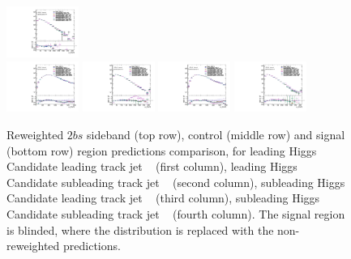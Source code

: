 \begin{figure}[htbp!]
\begin{center}
\includegraphics[width=0.21\textwidth,angle=-90]{figures/boosted/AppendixReweight/Compare/Data_TwoTag_split_Control_directcompare_sublHCand_trk1_Pt_1.pdf}\\
\includegraphics[width=0.21\textwidth,angle=-90]{figures/boosted/AppendixReweight/Compare/Data_TwoTag_split_Signal_directcompare_leadHCand_trk0_Pt_1.pdf}
\includegraphics[width=0.21\textwidth,angle=-90]{figures/boosted/AppendixReweight/Compare/Data_TwoTag_split_Signal_directcompare_leadHCand_trk1_Pt_1.pdf}
\includegraphics[width=0.21\textwidth,angle=-90]{figures/boosted/AppendixReweight/Compare/Data_TwoTag_split_Signal_directcompare_sublHCand_trk0_Pt_1.pdf}
\includegraphics[width=0.21\textwidth,angle=-90]{figures/boosted/AppendixReweight/Compare/Data_TwoTag_split_Signal_directcompare_sublHCand_trk1_Pt_1.pdf}\\
\caption{Reweighted $2bs$ sideband (top row), control (middle row) and signal (bottom row) region predictions comparison, for leading Higgs Candidate leading track jet \pt~ (first column),  leading Higgs Candidate subleading track jet \pt~ (second column), subleading Higgs Candidate leading track jet \pt~ (third column), subleading Higgs Candidate subleading track jet \pt~ (fourth column). The signal region is blinded, where the distribution is replaced with the non-reweighted predictions.}
\label{fig:app-rw-comp-2bs-trkjet}
\end{center}
\end{figure}

